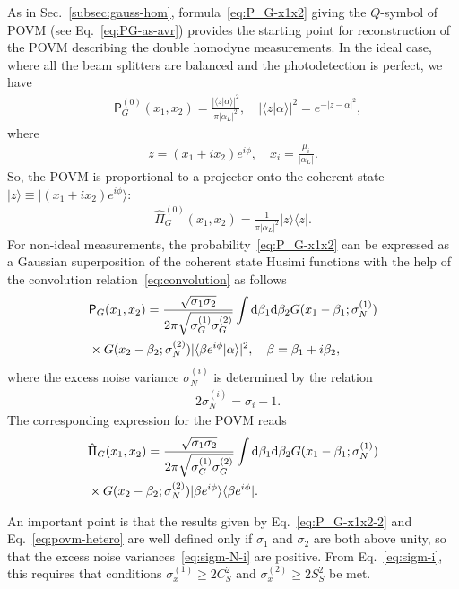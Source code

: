 \documentclass[%
reprint,
superscriptaddress,
 amsmath,amssymb,amsfonts,
 aps,
 pra,
 longbibliography
]{revtex4-2}
\newcommand{\ket}[1]{\ensuremath{|{#1}\rangle}}
\newcommand{\bra}[1]{\ensuremath{\langle{#1}|}}
\newcommand{\avr}[1]{\ensuremath{\langle{#1}\rangle}}
\newcommand{\prob}{\mathsf{P}}
\newcommand{\dd}{\mathrm{d}}
\begin{document}
As in Sec.~\ref{subsec:gauss-hom},
formula~\eqref{eq:P_G-x1x2}
giving the $Q$-symbol of POVM (see Eq.~\eqref{eq:PG-as-avr})
provides the starting point for reconstruction of the POVM
describing the double homodyne measurements.
In the ideal case, where all the beam splitters are balanced
and the photodetection is perfect,
we have
\begin{align}
  &
  \label{eq:P0-hetero}
    \prob_{G}^{(0)}(x_1,x_2)=\frac{|\avr{z|\alpha}|^2}{\pi |\alpha_L|^2},\quad
|\avr{z|\alpha}|^2=e^{-|z-\alpha|^2},
\end{align}
where
\begin{align}
  \label{eq:z}
    z=(x_1+ix_2) e^{i\phi},\quad     x_i=\frac{\mu_i}{|\alpha_L|}.
\end{align}
So, the POVM is proportional to a projector onto the coherent state
$\ket{z}\equiv\ket{(x_1+ix_2)e^{i\phi}}$:
\begin{align}
  \label{eq:POVM-hetero-ideal}
    \hat{\Pi}_G^{(0)}(x_1,x_2)=\frac{1}{\pi |\alpha_L|^2} \ket{z}\bra{z}.
\end{align}
For non-ideal measurements, the probability~\eqref{eq:P_G-x1x2}
can be expressed
as a Gaussian superposition of the coherent state Husimi functions
with the help of the convolution relation~\eqref{eq:convolution}
as follows
\begin{align}
  \label{eq:P_G-x1x2-2}
  &
    \prob_G(x_1,x_2)=\frac{\sqrt{\sigma_1\sigma_2}}{2\pi\sqrt{\sigma_G^{(1)}\sigma_G^{(2)}}}
\int \dd \beta_1\dd \beta_2
    G(x_1-\beta_1;\sigma_N^{(1)})
    \notag
  \\
  &
    \times
    G(x_2-\beta_2;\sigma_N^{(2)})
    |\avr{\beta e^{i\phi}|\alpha}|^2,\quad \beta=\beta_1+i\beta_2,
\end{align}
where the excess noise variance
$\sigma_N^{(i)}$ is determined by the relation
\begin{align}
  &
    \label{eq:sigm-N-i}
    2\sigma_{N}^{(i)}=\sigma_i-1.
\end{align}
The corresponding expression for the POVM reads
\begin{align}
  &
  \label{eq:povm-hetero}
    \hat{\Pi}_G(x_1,x_2)=\frac{\sqrt{\sigma_1\sigma_2}}{2\pi\sqrt{\sigma_G^{(1)}\sigma_G^{(2)}}}
\int \dd \beta_1\dd \beta_2
    G(x_1-\beta_1;\sigma_N^{(1)})
    \notag
  \\
  &
    \times
    G(x_2-\beta_2;\sigma_N^{(2)})
    \ket{\beta e^{i\phi}}\bra{\beta e^{i\phi}}.
\end{align}

An important point is that
the results given by Eq.~\eqref{eq:P_G-x1x2-2}
and Eq.~\eqref{eq:povm-hetero}
are well defined only if $\sigma_1$ and $\sigma_2$
are both above unity,
so that the excess noise variances~\eqref{eq:sigm-N-i} are
positive.
From Eq.~\eqref{eq:sigm-i},
this requires that conditions
$\sigma_x^{(1)}\ge 2 C_S^2$
and $\sigma_x^{(2)}\ge 2 S_S^2$ be met.
\end{document}
